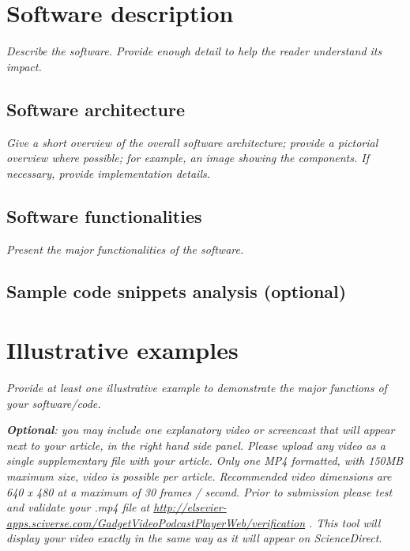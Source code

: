 \documentclass[11pt, a4paper, oneside, onecolumn]{article}
\begin{document}
\section{Software description}

\textit{Describe the software. Provide enough detail to help the reader understand its impact. }

\subsection{Software architecture}
\textit{  Give a short overview of the overall software architecture; provide a pictorial overview where possible; for example, an image showing the components. If necessary, provide implementation details.}

 \subsection{Software functionalities}
\textit{  Present the major functionalities of the software.}
  
 \subsection{Sample code snippets analysis (optional)}


\section{Illustrative examples}

\textit{Provide at least one illustrative example to demonstrate the major
functions of your software/code.}

\textit{\textbf{Optional}: you may include one explanatory  video or screencast that will appear next to your article, in the right hand side panel. Please upload any video as a single supplementary file with your article. Only one MP4 formatted, with 150MB maximum size, video is possible per article. Recommended video dimensions are 640 x 480 at a maximum of 30 frames / second. Prior to submission please test and validate your .mp4 file at  \url{http://elsevier-apps.sciverse.com/GadgetVideoPodcastPlayerWeb/verification} . This tool will display your video exactly in the same way as it will appear on ScienceDirect. }
\end{document}
